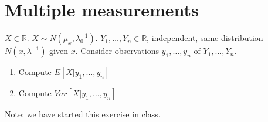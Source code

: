 \documentclass{article}[12pt]
\begin{document}
\begin{enumerate}
\end{enumerate}
\section{Multiple measurements}
$X \in \mathbb{R}$. $X \sim N(\mu_x,\lambda_0^{-1})$. $Y_1,\ldots,Y_n \in \mathbb{R}$, independent, same distribution $N(x,\lambda^{-1})$ given $x$. Consider observations $y_1,\ldots,y_n$ of $Y_1,\ldots,Y_n$.   
\begin{enumerate}
\item Compute $E[X|y_1,\ldots,y_n]$
\item Compute $Var[X|y_1,\ldots,y_n]$
\end{enumerate}
Note: we have started this exercise in class.
\end{document}
